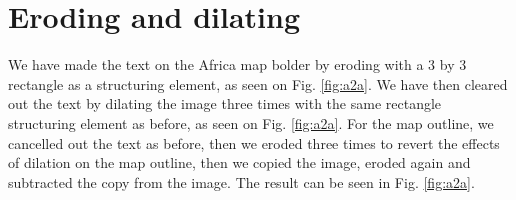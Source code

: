 \documentclass[11pt,a4paper]{article}
\begin{document}
\section{Eroding and dilating}
We have made the text on the Africa map bolder by eroding with a 3 by 3 rectangle as a structuring element, as seen on Fig. \ref{fig:a2a}. We have then cleared out the text by dilating the image three times with the same rectangle structuring element as before, as seen on Fig. \ref{fig:a2a}. For the map outline, we cancelled out the text as before, then we eroded three times to revert the effects of dilation on the map outline, then we copied the image, eroded again and subtracted the copy from the image. The result can be seen in Fig. \ref{fig:a2a}.
\begin{figure}%
\centering
{}
\quad
{}

\end{figure}
\end{document}
